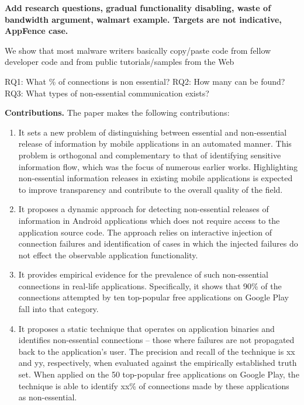 {\bf Add research questions, gradual functionality disabling, waste of bandwidth argument, walmart example. 
Targets are not indicative, AppFence case.

We show that most malware writers basically
copy/paste code from fellow developer code and from
public tutorials/samples from the Web~\cite{Allix:Jerome:Bissyande:Klein:State:Traon:COMPSAC14}

RQ1: What \% of connections is non essential?
RQ2: How many can be found?
RQ3: What types of non-essential communication exists?
}





\vspace{0.1in}
\noindent 
{\bf Contributions.}
The paper makes the following contributions:
\begin{enumerate}
\item It sets a new problem of distinguishing between essential and non-essential release of information by mobile applications in an automated manner. This problem is orthogonal and complementary to that of identifying sensitive information flow, which was the focus of numerous earlier works. 
Highlighting non-essential information releases in existing mobile applications is expected to improve transparency and contribute to the overall quality of the field. 
\item It proposes a dynamic approach for detecting non-essential releases of information in Android applications which does not require access to the application source code. 
The approach relies on interactive injection of connection failures and identification of cases in which the injected failures do not effect the observable application functionality. 
\item It provides empirical evidence for the prevalence of such non-essential connections in real-life applications. Specifically, it shows that 90\% of the connections attempted by ten top-popular free applications on Google Play fall into that category.    
\item It proposes a static technique that operates on application binaries and identifies non-essential connections -- those where failures are not propagated back to the application's user. The precision and recall of the technique is xx and yy, respectively, when evaluated against the empirically established truth set. 
When applied on the 50 top-popular free applications on Google Play, the technique is able to identify xx\% of connections made by these applications as non-essential.
\end{enumerate}

